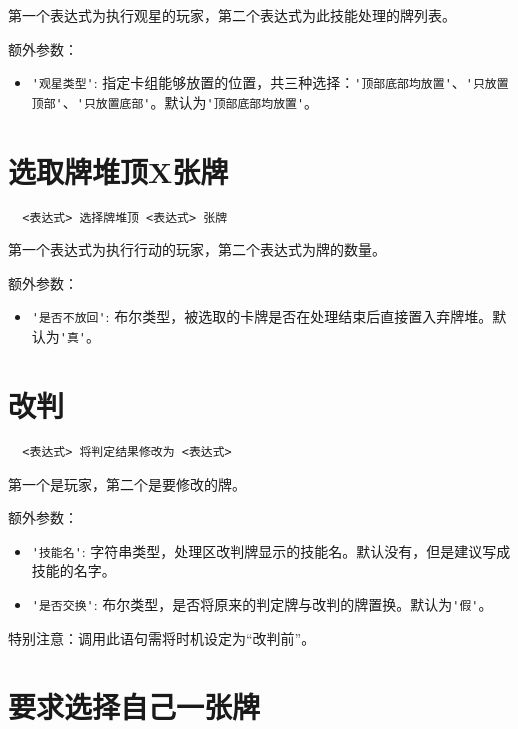 第一个表达式为执行观星的玩家，第二个表达式为此技能处理的牌列表。

额外参数：

\begin{itemize}
  \item \verb|'观星类型'|: 指定卡组能够放置的位置，共三种选择：\verb|'顶部底部均放置'|、\verb|'只放置顶部'|、\verb|'只放置底部'|。默认为\verb|'顶部底部均放置'|。
\end{itemize}

\section{选取牌堆顶X张牌}

\begin{verbatim}
  <表达式> 选择牌堆顶 <表达式> 张牌
\end{verbatim}

第一个表达式为执行行动的玩家，第二个表达式为牌的数量。

额外参数：

\begin{itemize}
  \item \verb|'是否不放回'|: 布尔类型，被选取的卡牌是否在处理结束后直接置入弃牌堆。默认为\verb|'真'|。
\end{itemize}

\section{改判}

\begin{verbatim}
  <表达式> 将判定结果修改为 <表达式>
\end{verbatim}

第一个是玩家，第二个是要修改的牌。

额外参数：

\begin{itemize}
  \item \verb|'技能名'|: 字符串类型，处理区改判牌显示的技能名。默认没有，但是建议写成技能的名字。
  \item \verb|'是否交换'|: 布尔类型，是否将原来的判定牌与改判的牌置换。默认为\verb|'假'|。
\end{itemize}

特别注意：调用此语句需将时机设定为“改判前”。

\section{要求选择自己一张牌}

